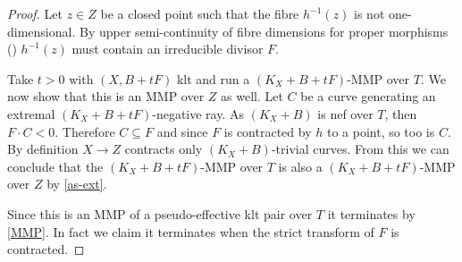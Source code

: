 \begin{proof}
	Let $z \in Z$ be a closed point such that the fibre $h^{-1}(z)$ is not one-dimensional. By upper semi-continuity of fibre dimensions for proper morphisms (\cite[\href{https://stacks.math.columbia.edu/tag/0D4Q}{Tag 0D4Q}]{stacks-project}) $h^{-1}(z)$ must contain an irreducible divisor $F$.
	
	Take $t >0$ with $(X,B+tF)$ klt and run a $(K_X+B+tF)$-MMP over $T$. 
	We now show that this is an MMP over $Z$ as well.	
	Let $C$ be a curve generating an extremal $(K_X+B+tF)$-negative ray. As $(K_{X}+B)$ is nef over $T$, then $F\cdot C <0$. Therefore $C \subseteq F$ and since $F$ is contracted by $h$ to a point, so too is $C$. 
	By definition $X \to Z$ contracts only $(K_X+B)$-trivial curves. From this we can conclude that the $(K_X+B+tF)$-MMP over $T$ is also a $(K_X+B+tF)$-MMP over $Z$ by \autoref{as-ext}.  
	
	
	Since this is an MMP of a pseudo-effective klt pair over $T$ it terminates by \autoref{MMP}. In fact we claim it terminates when the strict transform of $F$ is contracted.
	

\end{proof}
